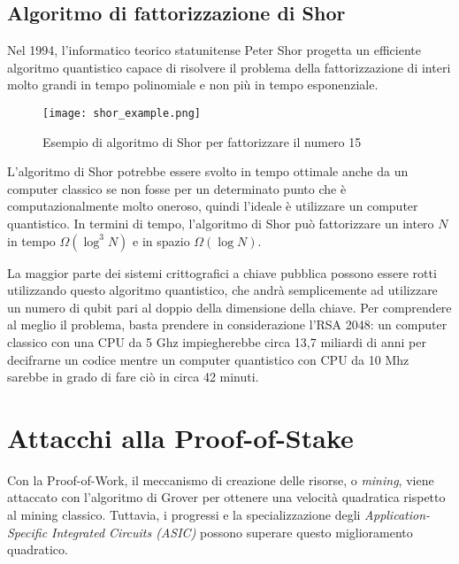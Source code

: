 \subsection{Algoritmo di fattorizzazione di Shor}
Nel 1994, l'informatico teorico statunitense Peter Shor progetta un efficiente algoritmo quantistico capace di risolvere il problema della fattorizzazione di interi molto grandi in tempo polinomiale e non più in tempo esponenziale.

\begin{figure}[h]
  \centering
  \texttt{[image: shor\_example.png]}
  \caption{Esempio di algoritmo di Shor per fattorizzare il numero 15}
  \label{fig:shor_example}
\end{figure}

L'algoritmo di Shor potrebbe essere svolto in tempo ottimale anche da un computer classico se non fosse per un determinato punto che è computazionalmente molto oneroso, quindi l'ideale è utilizzare un computer quantistico. In termini di tempo, l'algoritmo di Shor può fattorizzare un intero \(N\) in tempo \(\Omega(\log^3 N)\) e in spazio \(\Omega(\log N)\).

La maggior parte dei sistemi crittografici a chiave pubblica possono essere rotti utilizzando questo algoritmo quantistico, che andrà semplicemente ad utilizzare un numero di qubit pari al doppio della dimensione della chiave. Per comprendere al meglio il problema, basta prendere in considerazione l'RSA 2048: un computer classico con una CPU da 5 Ghz impiegherebbe circa 13,7 miliardi di anni per decifrarne un codice mentre un computer quantistico con CPU da 10 Mhz sarebbe in grado di fare ciò in circa 42 minuti\cite{kearney2021vulnerability}.

\section{Attacchi alla Proof-of-Stake}
Con la Proof-of-Work, il meccanismo di creazione delle risorse, o \textit{mining}, viene attaccato con l'algoritmo di Grover per ottenere una velocità quadratica rispetto al mining classico. Tuttavia, i progressi e la specializzazione degli \textit{Application-Specific Integrated Circuits (ASIC)} possono superare questo miglioramento quadratico.

